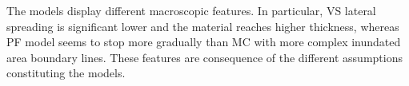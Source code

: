 \documentclass{article}
\begin{document}
\newpage
{}

The models display different macroscopic features. In particular, VS lateral spreading is significant lower and the material reaches higher thickness, whereas PF model seems to stop more gradually than MC with more complex inundated area boundary lines. These features are consequence of the different assumptions constituting the models.
\end{document}
